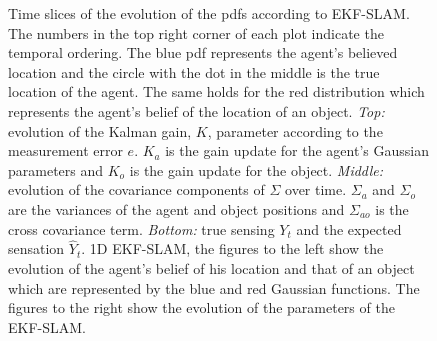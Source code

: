 \begin{figure}
\centering
{}
\caption{Time slices of the evolution of the pdfs according to EKF-SLAM. The numbers in the top right corner of each plot indicate the temporal ordering.
The blue pdf represents the agent's believed location and the circle with the dot in the middle is the true location of the agent. The same holds 
for the red distribution which represents the agent's belief of the location of an object.
\textit{Top:} evolution of the Kalman gain, $K$, parameter according to the measurement error $e$. $K_a$ is the gain update for the 
agent's Gaussian parameters and $K_o$ is the gain update for the object. \textit{Middle:} evolution of the covariance components of 
$\Sigma$ over time. $\Sigma_a$ and $\Sigma_o$ are the variances of the agent and object positions and $\Sigma_{ao}$ is the cross covariance 
term. \textit{Bottom:} true sensing $Y_t$ and the expected sensation $\hat{Y}_t$.
1D EKF-SLAM, the figures to the left show the evolution of the agent's belief of his location and that of an 
object which are represented by the blue and red Gaussian functions. The figures to the right show the evolution of the parameters of the EKF-SLAM.}
\label{fig:EKF-SLAM}


\end{figure}

